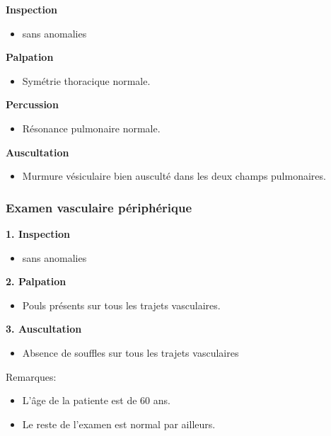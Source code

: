 \documentclass[12pt,a4paper]{article}%
\begin{document}
%
\textbf{Inspection}%
\begin{itemize}%
\setlength{\itemsep}{0pt}%
\item%
sans anomalies%
\end{itemize}%
\textbf{Palpation}%
\begin{itemize}%
\setlength{\itemsep}{0pt}%
\item%
Symétrie thoracique normale.%
\end{itemize}%
\textbf{Percussion}%
\begin{itemize}%
\setlength{\itemsep}{0pt}%
\item%
Résonance pulmonaire normale.%
\end{itemize}%
\textbf{Auscultation}%
\begin{itemize}%
\setlength{\itemsep}{0pt}%
\item%
Murmure vésiculaire bien ausculté dans les deux champs pulmonaires.%
\end{itemize}%
\subsubsection*{Examen vasculaire périphérique}%
\label{ssubsec:Examenvasculairepriphrique}%

%
\textbf{1. Inspection }%
\begin{itemize}%
\setlength{\itemsep}{0pt}%
\item%
sans anomalies%
\end{itemize}%
\textbf{2. Palpation}%
\begin{itemize}%
\setlength{\itemsep}{0pt}%
\item%
Pouls présents sur tous les trajets vasculaires.%
\end{itemize}%
\textbf{3. Auscultation}%
\begin{itemize}%
\setlength{\itemsep}{0pt}%
\item%
Absence de souffles sur tous les trajets vasculaires%
\end{itemize}%
Remarques:%
\begin{itemize}%
\setlength{\itemsep}{0pt}%
\item%
L'âge de la patiente est de 60 ans.%
\item%
Le reste de l'examen est normal par ailleurs.%
\end{itemize}%
%
\vspace*{\baselineskip}%
\end{document}
